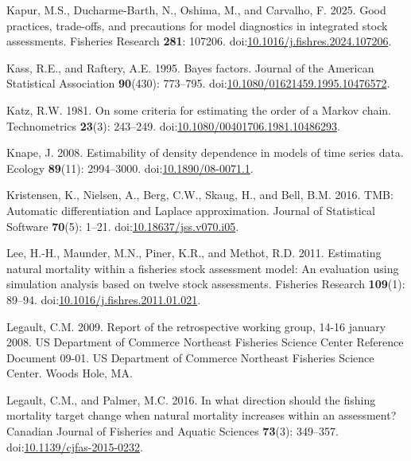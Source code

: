 \documentclass[
  12pt,
]{article}
\newlength{\cslhangindent}
\newlength{\cslentryspacingunit} %
\newenvironment{CSLReferences}[2] %
 {%
  \setlength{\parindent}{0pt}
  \ifodd #1
  \let\oldpar\par
  \def\par{\hangindent=\cslhangindent\oldpar}
  \fi
  \setlength{\parskip}{#2\cslentryspacingunit}
 }%
 {}
\begin{document}
\begin{CSLReferences}{1}{0}
\leavevmode{}%
Kapur, M.S., Ducharme-Barth, N., Oshima, M., and Carvalho, F. 2025. Good
practices, trade-offs, and precautions for model diagnostics in
integrated stock assessments. Fisheries Research \textbf{281}: 107206.
doi:\href{https://doi.org/10.1016/j.fishres.2024.107206}{10.1016/j.fishres.2024.107206}.

\leavevmode{}%
Kass, R.E., and Raftery, A.E. 1995. Bayes factors. Journal of the
American Statistical Association \textbf{90}(430): 773--795.
doi:\href{https://doi.org/10.1080/01621459.1995.10476572}{10.1080/01621459.1995.10476572}.

\leavevmode{}%
Katz, R.W. 1981. On some criteria for estimating the order of a {M}arkov
chain. Technometrics \textbf{23}(3): 243--249.
doi:\href{https://doi.org/10.1080/00401706.1981.10486293}{10.1080/00401706.1981.10486293}.

\leavevmode{}%
Knape, J. 2008. Estimability of density dependence in models of time
series data. Ecology \textbf{89}(11): 2994--3000.
doi:\href{https://doi.org/10.1890/08-0071.1}{10.1890/08-0071.1}.

\leavevmode{}%
Kristensen, K., Nielsen, A., Berg, C.W., Skaug, H., and Bell, B.M. 2016.
{TMB}: Automatic differentiation and {L}aplace approximation. Journal of
Statistical Software \textbf{70}(5): 1--21.
doi:\href{https://doi.org/10.18637/jss.v070.i05}{10.18637/jss.v070.i05}.

\leavevmode{}%
Lee, H.-H., Maunder, M.N., Piner, K.R., and Methot, R.D. 2011.
Estimating natural mortality within a fisheries stock assessment model:
An evaluation using simulation analysis based on twelve stock
assessments. Fisheries Research \textbf{109}(1): 89--94.
doi:\href{https://doi.org/10.1016/j.fishres.2011.01.021}{10.1016/j.fishres.2011.01.021}.

\leavevmode{}%
Legault, C.M. 2009. Report of the retrospective working group, 14-16
january 2008. US Department of Commerce Northeast Fisheries Science
Center Reference Document 09-01. US Department of Commerce Northeast
Fisheries Science Center. Woods Hole, MA.

\leavevmode{}%
Legault, C.M., and Palmer, M.C. 2016. In what direction should the
fishing mortality target change when natural mortality increases within
an assessment? Canadian Journal of Fisheries and Aquatic Sciences
\textbf{73}(3): 349--357.
doi:\href{https://doi.org/10.1139/cjfas-2015-0232}{10.1139/cjfas-2015-0232}.


\end{CSLReferences}
\end{document}

